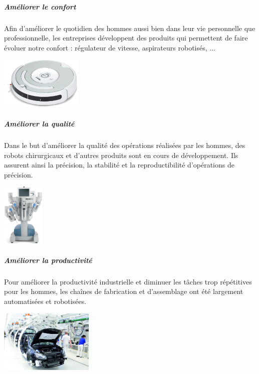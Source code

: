 \documentclass[11pt,oneside]{article}
\begin{document}
\subparagraph*{Améliorer le confort}
\begin{minipage}[c]{0.7\textwidth}
Afin d'améliorer le quotidien des hommes aussi bien dans leur vie personnelle
que professionnelle, les entreprises développent des produits qui permettent de
faire évoluer notre confort : régulateur de vitesse, aspirateurs robotisés, ...
\end{minipage}\hfill
\begin{minipage}[c]{0.2\textwidth}
 \begin{center}
 \includegraphics[height=2.5cm]{png/aspi}
 \end{center}
\end{minipage}

\subparagraph*{Améliorer la qualité}
\begin{minipage}[c]{0.7\textwidth}
Dans le but d'améliorer la qualité des opérations réalisées par les hommes, des
robots chirurgicaux et d'autres produits sont en cours de développement. Ils
assurent ainsi la précision, la stabilité et la reproductibilité d'opérations
de précision.
\end{minipage}\hfill
\begin{minipage}[c]{0.2\textwidth}
 \begin{center}
 \includegraphics[height=3cm]{png/robot_chir.png}
 \end{center}
\end{minipage}

\subparagraph*{Améliorer la productivité}

\begin{minipage}[c]{0.6\textwidth}
Pour améliorer la productivité industrielle et diminuer les tâches trop
répétitives pour les hommes, les chaînes de
fabrication et d'assemblage ont été largement automatisées et robotisées.
\end{minipage}\hfill
\begin{minipage}[c]{0.3\textwidth}
 \begin{center}
 \includegraphics[height=3cm]{png/chaine_prod.png}
 \end{center}
\end{minipage}
\end{document}
